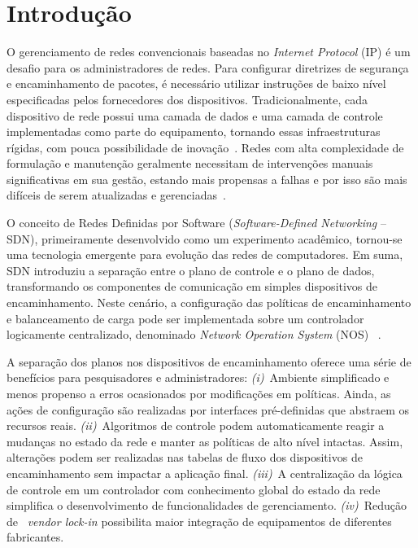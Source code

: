 \chapter{Introdução}
\label{cap:introducao}

O gerenciamento de redes convencionais baseadas no \emph{Internet Protocol} (IP) é um desafio para os administradores de redes.
Para configurar diretrizes de segurança e encaminhamento de pacotes, é necessário utilizar instruções de baixo nível especificadas pelos fornecedores dos dispositivos. 
Tradicionalmente, cada dispositivo de rede possui uma camada de dados e uma camada de controle implementadas como parte do equipamento, tornando essas infraestruturas rígidas, com pouca possibilidade de inovação~\cite{kim2013}. Redes com alta complexidade de formulação e manutenção geralmente necessitam de intervenções manuais significativas em sua gestão, estando mais propensas a falhas e por isso são mais difíceis de serem atualizadas e gerenciadas~\cite{benson2009}.

O conceito de Redes Definidas por Software (\textit{Software-Defined Networking} -- SDN), primeiramente desenvolvido como um experimento acadêmico, tornou-se uma tecnologia emergente para evolução das redes de computadores.
Em suma, SDN introduziu a separação entre o plano de controle e o plano de dados, transformando os componentes de comunicação em simples dispositivos de encaminhamento. 
Neste cenário, a configuração das políticas de encaminhamento e balanceamento de carga pode ser implementada sobre um controlador logicamente centralizado, denominado \emph{Network Operation System} (NOS) ~\cite{kreutz2015}.

A separação dos planos nos dispositivos de encaminhamento oferece uma série de benefícios para pesquisadores e administradores: \textit{(i)}~Ambiente simplificado e menos propenso a erros ocasionados por modificações em políticas. Ainda, as ações de configuração são realizadas por interfaces pré-definidas que abstraem os recursos reais. \textit{(ii)}~Algoritmos de controle podem automaticamente reagir a mudanças no estado da rede e  manter as políticas de alto nível intactas. Assim, alterações podem ser realizadas nas tabelas de fluxo dos dispositivos de encaminhamento sem impactar a aplicação final. \textit{(iii)}~A centralização da lógica de controle em um controlador com conhecimento global do estado da rede simplifica o desenvolvimento de funcionalidades de gerenciamento. \textit{(iv)}~Redução de ~\textit{vendor lock-in} possibilita maior integração de equipamentos de diferentes fabricantes.

